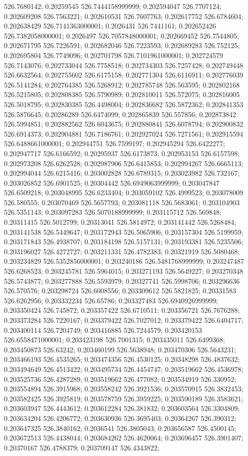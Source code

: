 526.7680142; 0.20259545 526.7444158999999; 0.202594047 526.7707124; 0.202609208 526.7563221; 0.202610531 526.7607763; 0.202617752 526.6784604; 0.202638429 526.7141363000001; 0.2026431 526.7441161; 0.202652426 526.7382058000001; 0.2026497 526.7057848000001; 0.202669452 526.7544805; 0.202671795 526.7226591; 0.202682046 526.7223593; 0.202689283 526.752125; 0.202695804 526.7749096; 0.202701798 526.7101961000001; 0.202724579 526.7143076; 0.202733044 526.7758518; 0.202734303 526.7257428; 0.202749448 526.6632564; 0.202755602 526.6175158; 0.202771304 526.6116911; 0.202776039 526.5141284; 0.202764385 526.5268912; 0.202785748 526.563595; 0.202802168 526.5215805; 0.202808385 526.5790989; 0.202810011 526.572075; 0.202816005 526.5018795; 0.202830385 526.4498004; 0.202836682 526.5872362; 0.202841353 526.5876645; 0.20286289 526.6474099; 0.202865839 526.557856; 0.202873842 526.5994851; 0.202882562 526.6043675; 0.202880841 526.6078794; 0.202900832 526.6914373; 0.202904881 526.7186761; 0.202927024 526.7271561; 0.202915594 526.6488661000001; 0.202944751 526.7599197; 0.202945294 526.6422277; 0.202947717 526.6166592; 0.20295937 526.6173873; 0.202953153 526.6157598; 0.202973208 526.6262528; 0.202987906 526.6415853; 0.202994267 526.6665113; 0.202994044 526.6215416; 0.203002828 526.6789315; 0.203023982 526.732167; 0.203026852 526.6901525; 0.20304442 526.6949063999999; 0.203047847 526.6509218; 0.203048995 526.6233404; 0.203059102 526.4999523; 0.203078009 526.580555; 0.203070469 526.5657793; 0.203081118 526.5683061; 0.203104903 526.5351143; 0.203097283 526.5070188999999; 0.203115712 526.569848; 0.20311415 526.5012799; 0.20313041 526.5814972; 0.203141442 526.5268484; 0.203141538 526.5449647; 0.203172943 526.5065906; 0.203157304 526.5199959; 0.203171843 526.4938707; 0.203184198 526.5157131; 0.203193381 526.5235506; 0.203196027 526.4272727; 0.203211331 526.4782383; 0.20321919 526.5080468; 0.203234829 526.5352856000001; 0.203240186 526.5481768999999; 0.203247487 526.6268523; 0.203245781 526.5964015; 0.203271193 526.5649227; 0.203270348 526.5743877; 0.203277888 526.5593979; 0.20327741 526.5998706; 0.203296636 526.570576; 0.203298724 526.6008556; 0.203309612 526.5821825; 0.20331583 526.6262956; 0.203332234 526.65786; 0.203327483 526.6940926999999; 0.203350424 526.745872; 0.203357422 526.6710511; 0.203356721 526.7676288; 0.203373284 526.7220167; 0.203379422 526.7027012; 0.203379422 526.6404717; 0.203400114 526.7204749; 0.203416885 526.7244579; 0.203420153 526.6558471000001; 0.203423198 526.7001315; 0.203435011 526.6499368; 0.203450873 526.63242; 0.203460199 526.5638948; 0.203470306 526.5643231; 0.203466193 526.4535265; 0.203474356 526.4530125; 0.20348298 526.4837632; 0.203494649 526.4513422; 0.203495734 526.4454747; 0.203519662 526.4536978; 0.203525736 526.4287289; 0.203519662 526.477082; 0.203534919 526.330952; 0.203554894 526.3915968; 0.203558242 526.3921536; 0.203570915 526.3832453; 0.203582425 526.3925819; 0.203578759 526.3959225; 0.203590189 526.3583621; 0.203603947 526.4443612; 0.203612284 526.381832; 0.203603564 526.3304809; 0.203634204 526.4206772; 0.203630936 526.3695403; 0.20364267 526.390312; 0.203647325 526.3840162; 0.2036541 526.3805043; 0.203656587 526.4500145; 0.203672513 526.4438044; 0.203684262 526.4620064; 0.203696457 526.3901407; 0.20370167 526.4788379; 0.203709147 526.4343822; 